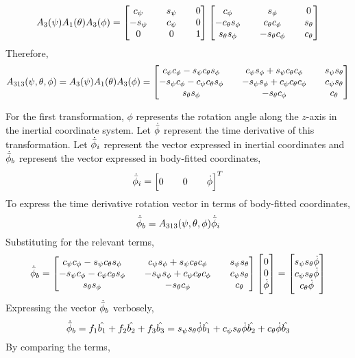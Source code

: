 \documentclass[class=report, 12pt, crop=false]{standalone}
\begin{document}
\begin{center}
$$A_{3}(\psi)A_{1}(\theta)A_{3}(\phi)= \begin{bmatrix}
c_\psi && s_\psi && 0 \\
-s_\psi && c_\psi && 0 \\
0 && 0 && 1 
\end{bmatrix}\begin{bmatrix}
c_\phi && s_\phi && 0 \\
-c_\theta s_\phi && c_\theta c_\phi && s_\theta \\
s_\theta s_\phi && -s_\theta c_\phi && c_\theta 
\end{bmatrix}$$
Therefore,
$$A_{313}(\psi,\theta,\phi) = A_{3}(\psi)A_{1}(\theta)A_{3}(\phi) = \begin{bmatrix}
c_\psi c_\phi - s_\psi c_\theta s_\phi && c_\psi s_\phi + s_\psi c_\theta c_\phi&& s_\psi s_\theta\\
-s_\psi c_\phi - c_\psi c_\theta s_\phi && -s_\psi s_\phi + c_\psi c_\theta c_\phi && c_\psi s_\theta\\
s_\theta s_\phi && -s_\theta c_\phi && c_\theta 
\end{bmatrix}$$

For the first transformation, $\phi$ represents the rotation angle along the $z$-axis in the inertial coordinate system. Let $\dot{\bar{\phi}}$ represent the time derivative of this transformation. Let $\dot{\bar{\phi}}_i$ represent the vector expressed in inertial coordinates and $\dot{\bar{\phi}}_b$ represent the vector expressed in body-fitted coordinates,
$$\dot{\bar{\phi}}_i = \begin{bmatrix}0 && 0 && \dot{\phi}\end{bmatrix}^T$$
To express the time derivative rotation vector in terms of body-fitted coordinates,
$$\dot{\bar{\phi}}_b = A_{313}(\psi,\theta,\phi)\dot{\bar{\phi}}_i$$
Substituting for the relevant terms,
$$\dot{\bar{\phi}}_b = \begin{bmatrix}
c_\psi c_\phi - s_\psi c_\theta s_\phi && c_\psi s_\phi + s_\psi c_\theta c_\phi&& s_\psi s_\theta\\
-s_\psi c_\phi - c_\psi c_\theta s_\phi && -s_\psi s_\phi + c_\psi c_\theta c_\phi && c_\psi s_\theta\\
s_\theta s_\phi && -s_\theta c_\phi && c_\theta 
\end{bmatrix}\begin{bmatrix}
0 \\ 0 \\ \dot{\phi}\end
{bmatrix} = \begin{bmatrix}
s_\psi s_\theta \dot{\phi}\\
c_\psi s_\theta \dot{\phi}\\
c_\theta\dot{\phi}
\end{bmatrix}$$
Expressing the vector $\dot{\bar{\phi}}_b$ verbosely,
$$\dot{\bar{\phi}}_b = f_1\hat{b_1} + f_2\hat{b_2} + f_3\hat{b_3} = s_\psi s_\theta \dot{\phi}\hat{b_1} + c_\psi s_\theta \dot{\phi}\hat{b_2} + c_\theta\dot{\phi}\hat{b_3}$$
By comparing the terms,
\\~\\




\end{center}
\end{document}
